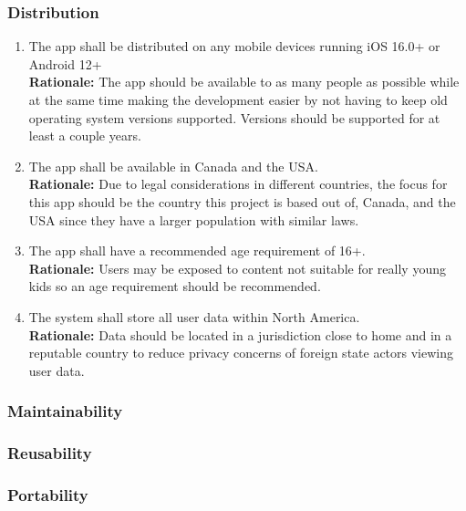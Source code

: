 \documentclass{article}
\begin{document}
\subsubsection{Distribution}
\label{ssub:distribution}


\begin{enumerate}[align=left, label=\textbf{DI-D\arabic*.}]
    \item The app shall be distributed on any mobile devices running iOS 16.0+ or Android 12+\\
    {\bf Rationale:} The app should be available to as many people as possible while at the same time making the development easier by not having to keep old operating system versions supported. Versions should be supported for at least a couple years.
    \item The app shall be available in Canada and the USA.\\
    {\bf Rationale:} Due to legal considerations in different countries, the focus for this app should be the country this project is based out of, Canada, and the USA since they have a larger population with similar laws.
    \item The app shall have a recommended age requirement of 16+.\\
    {\bf Rationale:} Users may be exposed to content not suitable for really young kids so an age requirement should be recommended.
    \item The system shall store all user data within North America.\\
    {\bf Rationale:} Data should be located in a jurisdiction close to home and in a reputable country to reduce privacy concerns of foreign state actors viewing user data.
\end{enumerate}

\subsubsection{Maintainability}


\subsubsection{Reusability}

\subsubsection{Portability}
\label{ssub:portability}
\end{document}
